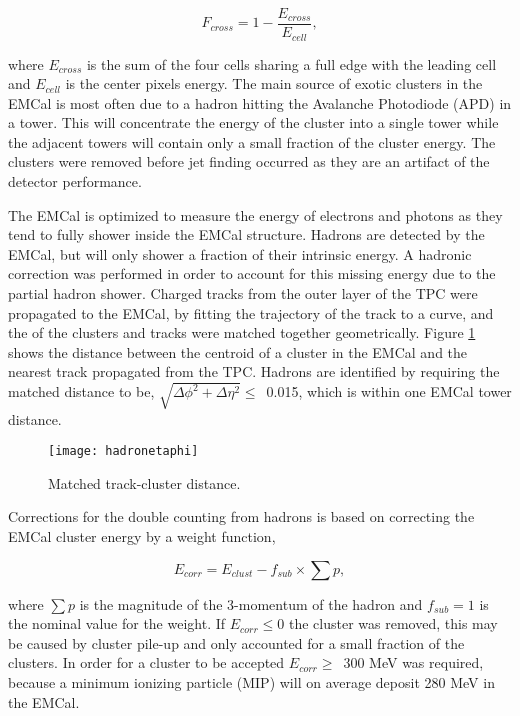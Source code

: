 \begin{equation}
F_{cross} = 1 - \frac{ E_{cross} }{ E_{cell} },
\label{eq:Fcross}
\end{equation}

\noindent
where $E_{cross}$ is the sum of the four cells sharing a full edge with the leading cell and $E_{cell}$ is the center pixels energy.  The main source of exotic clusters in the EMCal is most often due to a hadron hitting the Avalanche Photodiode (APD) in a tower.  This will concentrate the energy of the cluster into a single tower while the adjacent towers will contain only a small fraction of the cluster energy.  The clusters were removed before jet finding occurred as they are an artifact of the detector performance.

The EMCal is optimized to measure the energy of electrons and photons as they tend to fully shower inside the EMCal structure.  Hadrons are detected by the EMCal, but will only shower a fraction of their intrinsic energy.  A hadronic correction was performed in order to account for this missing energy due to the partial hadron shower.  Charged tracks from the outer layer of the TPC were propagated to the EMCal, by fitting the trajectory of the track to a curve, and the of the clusters and tracks were matched together geometrically.  Figure \ref{fig:EMChadetaphi} shows the distance between the centroid of a cluster in the EMCal and the nearest track propagated from the TPC.  Hadrons are identified by requiring the matched distance to be, $\sqrt{ \Delta\phi^{2} + \Delta\eta^{2} } \leq \,$ 0.015, which is within one EMCal tower distance.

\begin{figure}[h]
\texttt{[image: hadronetaphi]}
\centering
\caption{Matched track-cluster distance.}
\label{fig:EMChadetaphi}
\end{figure}

\noindent
Corrections for the double counting from hadrons is based on correcting the EMCal cluster energy by a weight function,

\begin{equation}
E_{corr} = E_{clust} - f_{sub} \times \sum p ,
\label{eq:HadCorr}
\end{equation}

\noindent
where $\sum p$ is the magnitude of the 3-momentum of the hadron and $f_{sub} = 1$ is the nominal value for the weight.  If $E_{corr} \leq 0$ the cluster was removed, this may be caused by cluster pile-up and only accounted for a small fraction of the clusters.  In order for a cluster to be accepted $E_{corr} \geq \,$ 300 MeV was required, because a minimum ionizing particle (MIP) will on average deposit 280 MeV in the EMCal.  

